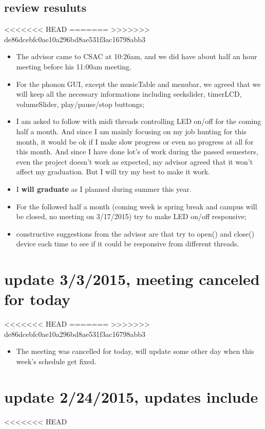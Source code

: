 \documentclass[9pt,b5paper]{article}
\begin{document}
\subsection{review resuluts}
<<<<<<< HEAD
\label{sec-3-4}
=======
\label{sec-2-4}
>>>>>>> de86dcebfc0ae10a296bd8ae531f3ac16798abb3
\begin{itemize}
\item The advisor came to CSAC at 10:26am, and we did have about half an hour meeting before his 11:00am meeting.
\item For the phonon GUI, except the musicTable and menubar, we agreed that we will keep all the necessary informations including seekslider, timerLCD, volumeSlider, play/pause/stop buttongs;
\item I am asked to follow with midi threads controlling LED on/off for the coming half a month. And since I am mainly focusing on my job hunting for this month, it would be ok if I make slow progress or even no progress at all for this month. And since I have done lot's of work during the passed semesters, even the project doesn't work as expected, my advisor agreed that it won't affect my graduation. But I will try my best to make it work.
\item I \textbf{will graduate} as I planned during summer this year.
\item For the followed half a month (coming week is spring break and campus will be closed, no meeting on 3/17/2015) try to make LED on/off responsive;
\item constructive suggestions from the advisor are that try to open() and close() device each time to see if it could be responsive from different threads.
\end{itemize}

\section{update 3/3/2015, meeting canceled for today}
<<<<<<< HEAD
\label{sec-4}
=======
\label{sec-3}
>>>>>>> de86dcebfc0ae10a296bd8ae531f3ac16798abb3
\begin{itemize}
\item The meeting was cancelled for today, will update some other day when this week's schedule get fixed.
\end{itemize}
\section{update 2/24/2015, updates include}
<<<<<<< HEAD
\label{sec-5}
\end{document}
